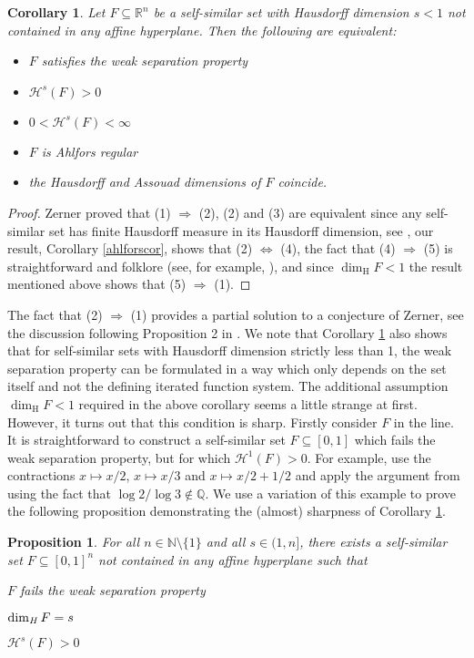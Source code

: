 \documentclass[11pt,english,british]{article}
\numberwithin{equation}{section}
\newtheorem{cor}[thm]{Corollary}
\newtheorem{prop}[thm]{Proposition}
\begin{document}
\begin{cor} \label{ahlforscor2}
Let $F\subseteq \mathbb{R}^n$ be a self-similar set with Hausdorff dimension $s<1$ not contained in any affine hyperplane.  Then the following are equivalent:
\begin{itemize}
\item[(1)] $F$ satisfies the weak separation property
\item[(2)] $\mathcal{H}^s (F) >0$
\item[(3)] $0<\mathcal{H}^s (F) < \infty$
\item[(4)] $F$ is Ahlfors regular
\item[(5)] the Hausdorff and Assouad dimensions of $F$ coincide.
\end{itemize}
\end{cor}

\begin{proof}
Zerner \cite[Corollary after Proposition 2]{zerner} proved that (1) $\Rightarrow$ (2), (2) and (3) are equivalent since any self-similar set has finite Hausdorff measure in its Hausdorff dimension, see \cite[Corollary 3.3]{falconer}, our result, Corollary \ref{ahlforscor}, shows that (2) $\Leftrightarrow$ (4), the fact that (4) $\Rightarrow$ (5) is straightforward and folklore (see, for example, \cite[Proposition 2.1 (viii)]{tyson}), and since $\dim_\text{H} F < 1$ the result mentioned above \cite[Theorem 1.4]{assouadoverlaps} shows that (5) $\Rightarrow$ (1).
\end{proof}

The fact that (2) $\Rightarrow$ (1) provides a partial solution to a conjecture of Zerner, see the discussion following Proposition 2 in \cite{zerner}. We note that Corollary \ref{ahlforscor2} also shows that for self-similar sets with Hausdorff dimension strictly less than 1, the weak separation property can be formulated in a way which only depends on the set itself and not the defining iterated function system. The additional assumption $\dim_\text{H} F< 1$ required in the above corollary seems a little strange at first.  However, it turns out that this condition is sharp.  Firstly consider $F$ in the line.  It is straightforward to construct a self-similar set $F \subseteq [0,1]$ which fails the weak separation property, but for which $\mathcal{H}^1 (F) >0$.  For example, use the contractions $x \mapsto x/2$, $x \mapsto x/3$ and $x \mapsto x/2+1/2$ and apply the argument from \cite[Example 3.1]{fraser} using the fact that $\log 2/ \log 3 \notin \mathbb{Q}$.  We use a variation of this example to prove the following proposition demonstrating the (almost) sharpness of Corollary \ref{ahlforscor2}.
\begin{prop} \label{ahlforscor3}
For all $n \in \mathbb{N}\setminus \{1\}$ and all $s \in (1,n]$, there exists a self-similar set $F \subseteq [0,1]^n$ not contained in any affine hyperplane such that
\item[(1)] $F$ fails the weak separation property
\item[(2)] $\dim_\text{\emph{H}} F = s$
\item[(3)] $\mathcal{H}^s (F) >0$
\end{prop}
\end{document}
